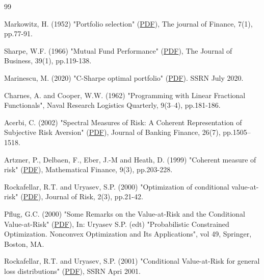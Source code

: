 \begin{thebibliography}{99}


 Markowitz, H. (1952) "Portfolio selection"
(\href{https://www.math.hkust.edu.hk/~maykwok/courses/ma362/07F/markowitz_JF.pdf}{PDF}), The journal of Finance, 7(1), pp.77-91.

 Sharpe, W.F. (1966) "Mutual Fund Performance"
(\href{http://www.stat.ucla.edu/~nchristo/statistics_c183_c283/sharpe__mutual_fund_performance.pdf}{PDF}),
The Journal of Business, 39(1), pp.119-138.

 Marinescu, M. (2020) "C-Sharpe optimal portfolio"
(\href{https://ssrn.com/abstract=3671774}{PDF}). SSRN July 2020.

 Charnes, A. and Cooper, W.W. (1962) "Programming with Linear Fractional Functionals",
Naval Research Logistics Quarterly, 9(3–4), pp.181-186.

 Acerbi, C. (2002) "Spectral Measures of Risk: A Coherent Representation of Subjective Risk Aversion"
(\href{http://www.pacca.info/public/files/docs/public/finance/Active\%20Risk\%20Management/SpectralMeasures.pdf}{PDF}),
Journal of Banking  Finance, 26(7), pp.1505–1518.

 Artzner, P., Delbaen, F., Eber, J.-M and Heath, D. (1999) "Coherent measure of risk"
(\href{http://www.planchet.net/EXT/ISFA/1226.nsf/9c8e3fd4d8874d60c1257052003eced6/0bd2345fdff664eec1256e16004ff688/$FILE/Coherent\%20Measures\%20of\%20Risk.pdf}{PDF}),
Mathematical Finance, 9(3), pp.203-228.

 Rockafellar, R.T. and Uryasev, S.P. (2000) "Optimization of conditional value-at-risk"
(\href{https://sites.math.washington.edu/~rtr/papers/rtr179-CVaR1.pdf}{PDF}), Journal of Risk, 2(3), pp.21-42.

 Pflug, G.C. (2000) "Some Remarks on the Value-at-Risk and the Conditional Value-at-Risk"
(\href{http://www.pacca.info/public/files/docs/public/finance/Active\%20Risk\%20Management/gpfl.pdf}{PDF}), In: Uryasev S.P. (edt) "Probabilistic Constrained Optimization.
Nonconvex Optimization and Its Applications", vol 49, Springer, Boston, MA.

 Rockafellar, R.T. and Uryasev, S.P. (2001) "Conditional Value-at-Risk for general loss distributions"
(\href{https://ssrn.com/abstract=267256}{PDF}), SSRN Apri 2001.


\end{thebibliography}

